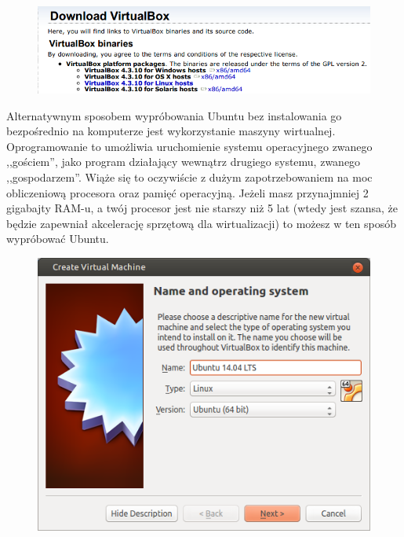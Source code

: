 \begin{figure}
	\vspace{-10pt}
	\includegraphics[width=\linewidth]{images/virtualbox_download.png}
\end{figure}

Alternatywnym sposobem wypróbowania Ubuntu bez instalowania go bezpośrednio na komputerze jest wykorzystanie maszyny wirtualnej. Oprogramowanie to umożliwia uruchomienie systemu operacyjnego zwanego ,,gościem'', jako program działający wewnątrz drugiego systemu, zwanego ,,gospodarzem''. Wiąże się to oczywiście z dużym zapotrzebowaniem na moc obliczeniową procesora oraz pamięć operacyjną. Jeżeli masz przynajmniej 2 gigabajty RAM-u, a twój procesor jest nie starszy niż 5 lat (wtedy jest szansa, że będzie zapewniał akcelerację sprzętową dla wirtualizacji) to możesz w ten sposób wypróbować Ubuntu.

\begin{figure}
	\vspace{-10pt}
	\includegraphics[width=\linewidth]{images/virtualbox_wizard1.png}
\end{figure}


